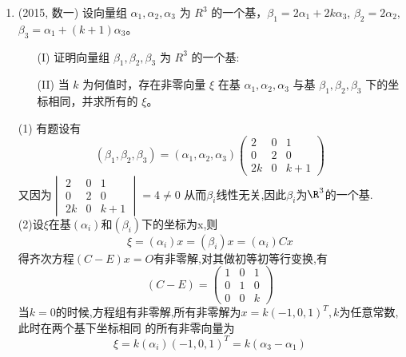 \documentclass[12pt, a4paper, oneside, UTF8]{ctexbook}
\begin{document}
\begin{enumerate}
    \item (2015, 数一) 设向量组 $\alpha_1, \alpha_2, \alpha_3$ 为 $R^3$ 的一个基，$\beta_1 = 2\alpha_1 + 2k\alpha_3$, $\beta_2 = 2\alpha_2$,
    $\beta_3 = \alpha_1 + (k+1)\alpha_3$。
    \begin{enumerate}
        \item [(I)] 证明向量组 $\beta_1, \beta_2, \beta_3$ 为 $R^3$ 的一个基:
        \item [(II)] 当 $k$ 为何值时，存在非零向量 $\xi$ 在基 $\alpha_1, \alpha_2, \alpha_3$ 与基 $\beta_1, \beta_2, \beta_3$ 下的坐标相同，并求所有的 $\xi$。
    \end{enumerate}
    
    \begin{solution}
    (1) 有题设有
    $$
    (\beta_1,\beta_2,\beta_3)=(\alpha_1,\alpha_2,\alpha_3)\begin{pmatrix}
        2 & 0 & 1\\
        0 & 2 & 0 \\
        2k & 0 & k+1 
    \end{pmatrix}
    $$
    又因为$\begin{vmatrix}
        2 & 0 & 1\\
        0 & 2 & 0 \\
        2k & 0 & k+1 
    \end{vmatrix}=4\neq 0$ 从而$\beta_i$线性无关,因此$\beta_i$为$\R^3$的一个基. \\
    (2)设$\xi$在基$(\alpha_i)$和$(\beta_i)$下的坐标为x,则
    $$
    \xi=(\alpha_i)x=(\beta_i)x=(\alpha_i)Cx 
    $$
    得齐次方程$(C-E)x=O$有非零解,对其做初等初等行变换,有
    $$
    (C-E)=\begin{pmatrix}
        1 & 0 & 1 \\
        0 & 1 & 0 \\
        0 & 0 & k
    \end{pmatrix}
    $$ 当$k=0$的时候,方程组有非零解,所有非零解为$x=k(-1,0,1)^T,k$为任意常数,此时在两个基下坐标相同
    的所有非零向量为 
    $$
    \xi = k(\alpha_i)(-1,0,1)^T=k(\alpha_3-\alpha_1) 
    $$
    \end{solution}
\end{enumerate}

\ifx\allfiles\undefined
\end{document}
